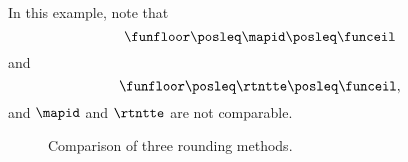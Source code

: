\begin{example}
    In this example, note that
    \begin{equation}
        \funfloor \posleq \mapid \posleq \funceil
    \end{equation}
    and
    \begin{equation}
        \funfloor \posleq \rtntte \posleq \funceil,
    \end{equation}
    and $\mapid$ and $\rtntte$ are not comparable.

\end{example}
\begin{figure*}[b]
    \centering
    \hfill
    \hfill
    \caption{Comparison of three rounding methods.}
\end{figure*}